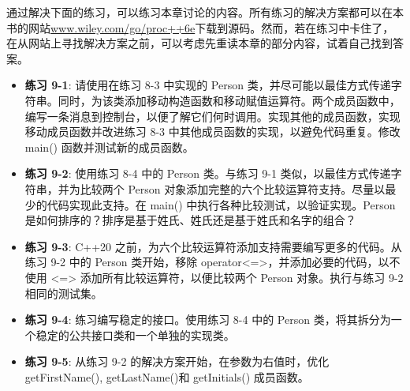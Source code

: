 
通过解决下面的练习，可以练习本章讨论的内容。所有练习的解决方案都可以在本书的网站\url{www.wiley.com/go/proc++6e}下载到源码。然而，若在练习中卡住了，在从网站上寻找解决方案之前，可以考虑先重读本章的部分内容，试着自己找到答案。

\begin{itemize}
\item
\textbf{练习 9-1}: 请使用在练习 8-3 中实现的 Person 类，并尽可能以最佳方式传递字符串。同时，为该类添加移动构造函数和移动赋值运算符。两个成员函数中，编写一条消息到控制台，以便了解它们何时调用。实现其他的成员函数，实现移动成员函数并改进练习 8-3 中其他成员函数的实现，以避免代码重复。修改 main() 函数并测试新的成员函数。

\item
\textbf{练习 9-2}: 使用练习 8-4 中的 Person 类。与练习 9-1 类似，以最佳方式传递字符串，并为比较两个 Person 对象添加完整的六个比较运算符支持。尽量以最少的代码实现此支持。在 main() 中执行各种比较测试，以验证实现。Person 是如何排序的？排序是基于姓氏、姓氏还是基于姓氏和名字的组合？

\item
\textbf{练习 9-3}:  C++20 之前，为六个比较运算符添加支持需要编写更多的代码。从练习 9-2 中的 Person 类开始，移除 operator<=>，并添加必要的代码，以不使用 <=> 添加所有比较运算符，以便比较两个 Person 对象。执行与练习 9-2 相同的测试集。

\item
\textbf{练习 9-4}: 练习编写稳定的接口。使用练习 8-4 中的 Person 类，将其拆分为一个稳定的公共接口类和一个单独的实现类。

\item
\textbf{练习 9-5}: 从练习 9-2 的解决方案开始，在参数为右值时，优化 getFirstName(), getLastName()和 getInitials() 成员函数。
\end{itemize}






